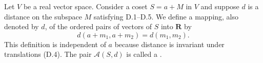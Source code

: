 Let $V$ be a real vector space. Consider a coset $S = a + M$ in $V$ and suppose $d$ is a distance on the subspace $M$ satisfying D.1--D.5. We define a mapping, also denoted by $d$, of the ordered pairs of vectors of $S$ into $\mathbf{R}$ by
$$d(a + m_1, a + m_2) = d(m_1, m_2).$$
This definition is independent of $a$ because distance is invariant under translations (D.4). The pair $\mathcal{A}(S, d)$ is called a .
